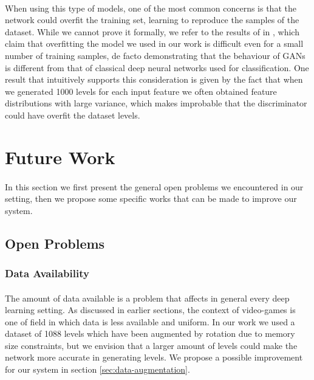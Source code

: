 \paragraph{} When using this type of models, one of the most common concerns is that the network could overfit the training set, learning to reproduce the samples of the dataset. While we cannot prove it formally, we refer to the results of \citeauthor{empiricalevaluation} in \cite[Appendix~C]{empiricalevaluation}, which claim that overfitting the model we used in our work is difficult even for a small number of training samples, de facto demonstrating that the behaviour of GANs is different from that of classical deep neural networks used for classification. One result that intuitively supports this consideration is given by the fact that when we generated 1000 levels for each input feature we often obtained feature distributions with large variance, which makes improbable that the discriminator could have overfit the dataset levels.



\section{Future Work}
\label{sec:futurework}
\paragraph{} In this section we first present the general open problems we encountered in our setting, then we propose some specific works that can be made to improve our system.
\subsection{Open Problems}
\subsubsection{Data Availability}
\paragraph{} The amount of data available is a problem that affects in general every deep learning setting. As discussed in earlier sections, the context of video-games is one of field in which data is less available and uniform. In our work we used a dataset of 1088 levels which have been augmented by rotation due to memory size constraints, but we envision that a larger amount of levels could make the network more accurate in generating levels. We propose a possible improvement for our system in section \ref{sec:data-augmentation}.
